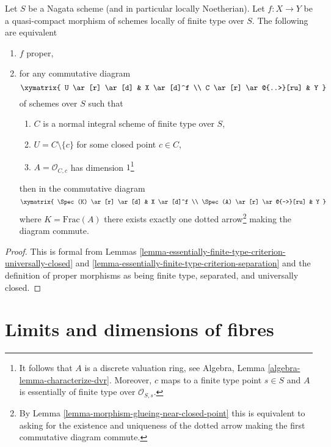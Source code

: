 \begin{lemma}
\label{lemma-essentially-finite-type-criterion-proper}
Let $S$ be a Nagata scheme (and in particular locally Noetherian).
Let $f : X \to Y$ be a quasi-compact morphism of schemes locally
of finite type over $S$. The following are equivalent
\begin{enumerate}
\item $f$ proper,
\item for any commutative diagram
$$
\xymatrix{
U \ar[r] \ar[d] & X \ar[d]^f \\
C \ar[r] \ar@{..>}[ru] & Y
}
$$
of schemes over $S$ such that
\begin{enumerate}
\item $C$ is a normal integral scheme of finite type over $S$,
\item $U = C \setminus \{c\}$ for some closed point $c \in C$,
\item $A = \mathcal{O}_{C, c}$ has dimension $1$\footnote{It follows
that $A$ is a discrete valuation ring, see
Algebra, Lemma \ref{algebra-lemma-characterize-dvr}.
Moreover, $c$ maps to a finite type point $s \in S$ and
$A$ is essentially of finite type over $\mathcal{O}_{S, s}$.}
\end{enumerate}
then in the commutative diagram
$$
\xymatrix{
\Spec(K) \ar[r] \ar[d] & X \ar[d]^f \\
\Spec(A) \ar[r] \ar@{-->}[ru] & Y
}
$$
where $K = \text{Frac}(A)$ there exists exactly one dotted arrow\footnote{By
Lemma \ref{lemma-morphism-glueing-near-closed-point} this is
equivalent to asking for the existence and uniqueness of the dotted arrow
making the first commutative diagram commute.}
making the diagram commute.
\end{enumerate}
\end{lemma}

\begin{proof}
This is formal from Lemmas
\ref{lemma-essentially-finite-type-criterion-universally-closed} and
\ref{lemma-essentially-finite-type-criterion-separation}
and the definition of proper morphisms as being finite type, separated,
and universally closed.
\end{proof}






\section{Limits and dimensions of fibres}
\label{section-limits-dimension}

